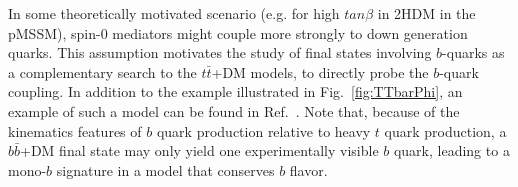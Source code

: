 

In some theoretically motivated scenario (e.g. for high $tan\beta$ in 2HDM in the pMSSM), 
spin-0 mediators might couple more strongly to down generation quarks.
This assumption motivates the study of final states involving $b$-quarks 
as a complementary search to the $t\bar
t$+DM models, to directly probe the $b$-quark coupling. 
In addition to the example illustrated in Fig.~\ref{fig:TTbarPhi}, an example of such a model can be found in Ref.~\cite{Buckley:2014fba}.
Note that, because of the kinematics features of $b$ quark production relative
to heavy $t$ quark production, a $b\bar b$+DM final state may only yield one
experimentally visible $b$ quark, leading to a mono-$b$ signature in a model that conserves $b$ flavor.


